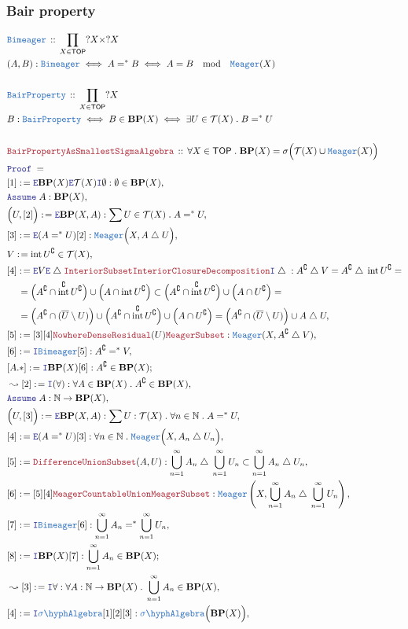 \documentclass[12pt]{scrartcl}
\newcommand{\TYPE}[1]{\textcolor{NavyBlue}{\mathtt{#1}}}
\newcommand{\LOGIC}[1]{\textcolor{Blue}{\mathtt{#1}}}
\newcommand{\THM}[1]{\textcolor{Maroon}{\mathtt{#1}}}
\renewcommand{\.}{\; . \;}
\newcommand{\de}{: \kern 0.1pc =}
\newcommand{\Theorem}[2]{& \THM{#1} \, :: \, #2 \\ & \Proof = \\ }
\newcommand{\DeclareType}[2]{& \TYPE{#1} \, :: \, #2 \\}
\newcommand{\DefineNamedType}[4]{& #1 : \TYPE{#2} \iff #3 \iff #4 \\}
\newcommand{\NewLine}{\\ & \kern 1pc}
\newcommand{\Page}[1]{ \begin{align*} #1 \end{align*}   }
\newcommand{\Intro}{\LOGIC{I}}
\newcommand{\Elim}{\LOGIC{E}}
\newcommand{\Nat}{\mathbb{N} }
\newcommand{\du}{\; \triangle \;}
\renewcommand{\c}{\complement}
\newcommand{\Eqmod}[3]{#1 = #2 \quad \mathrm{mod} \quad #3}
\newcommand{\Say}[3]{& #1 \de #2 : #3, \\}
\newcommand{\SayIn}[3]{& #1 \de #2 \in #3, \\}
\newcommand{\Conclude}[3]{& #1 \de #2 : #3; \\}
\newcommand{\Derive}[3]{& \leadsto #1 \de #2 : #3, \\}
\newcommand{\Assume}[2]{& \LOGIC{Assume} \; #1 : #2, \\}
\newcommand{\Proof}{\LOGIC{Proof} \; }
\newcommand{\SA}{\TYPE{\sigma \hyph Algebra}}
\newcommand{\Meager}{\TYPE{Meager}}
\DeclareMathOperator*{\intx}{int}
\newcommand{\TOP}{\mathsf{TOP}}
\newcommand{\T}{\mathcal{T}}
\newcommand{\BP}{\mathbf{BP}}
\begin{document}
\subsubsection{Bair property}
\Page{
	\DeclareType{Bimeager}{\prod_{X \in \TOP} ?X \times ?X}
	\DefineNamedType{(A,B)}{Bimeager}{A =^* B}{\Eqmod{A}{B}{\Meager(X)}}
	\\
	\DeclareType{BairProperty}{\prod_{X \in \TOP} ?X}
	\DefineNamedType{B}{BairProperty}{B \in \BP(X)}{\exists U \in \T(X) \. B =^* U}
	\\
	\Theorem{BairPropertyAsSmallestSigmaAlgebra}
	{
		\forall X \in \TOP \. 
		\BP(X) = \sigma\Big( \T(X) \cup \TYPE{Meager}(X) \Big)
	}
	\Say{[1]}{\Elim \BP(X) \Elim \T(X) \Intro \emptyset}{\emptyset \in \BP(X)}
	\Assume{A}{\BP(X)}
	\Say{\Big(U,[2]\Big)}{\Elim \BP(X,A)}{\sum U \in \T(X) \. A =^* U}
	\Say{[3]}{\Elim(A =^* U)[2]}{ \Meager\Big(X,A \du U\Big) }
	\SayIn{V}{\intx U^\c}{\T(X)}
	\Say{[4]}
	{
		\Elim V
		\Elim \du
		\THM{InteriorSubset}
		\THM{InteriorClosureDecomposition}
		\Intro \du
	}
	{
		A^\c \du V = 
		A^\c \du \intx{U^\c} = \NewLine =
		\Big(A^\c \cap \intx^\c {U^\c}\Big)
		\cup
		\Big(A \cap \intx{U^\c}  \Big)
		\subset 
		\Big(A^\c \cap \intx^\c{U^\c} \Big)
		\cup
		\Big( A \cap U^\c  \Big)  = \NewLine = 
		\Big( A^\c \cap  (\overline{U}\setminus U) \Big) \cup
		\Big( A^\c \cap \intx^\c {U^\c} \Big) \cup
		\Big( A \cap U^\c \Big) =
		\Big( A^\c \cap (\overline{U}\setminus U) \Big) \cup
		A \du U
	}
	\Say{[5]}{[3][4]\THM{NowhereDenseResidual}(U)\THM{MeagerSubset}}
	{
		\Meager(X, A^\c \du V)
	}
	\Say{[6]}{\Intro \TYPE{Bimeager}[5]}
	{
		A^\c =^* V
	}
	\Conclude{[A.*]}{\Intro \BP(X)[6]}{A^\c \in \BP(X)}
	\Derive{[2]}{\Intro(\forall)}{\forall A \in \BP(X) \. A^\c \in \BP(X)}
	\Assume{A}{\Nat \to \BP(X)}
	\Say{\Big(U,[3]\Big)}{\Elim \BP(X,A)}{\sum U  : \T(X) \. \forall n \in \Nat \. A =^* U}
	\Say{[4]}{\Elim(A =^* U)[3]}{ \forall n \in \Nat \. \Meager\Big(X,A_n \du U_n\Big) }
	\Say{[5]}{\THM{DifferenceUnionSubset}(A,U)}
	{
		\bigcup^\infty_{n=1} A_n \du \bigcup^\infty_{n=1} U_n \subset
		\bigcup^\infty_{n=1} A_n \du U_n
	}
	\Say{[6]}{[5][4]\THM{MeagerCountableUnion}\THM{MeagerSubset}}
	{
		\Meager\left(X, \bigcup^\infty_{n=1} A_n \du \bigcup^\infty_{n=1} U_n \right)
	}
	\Say{[7]}{
		\Intro \TYPE{Bimeager}[6]
	}
	{
			\bigcup^\infty_{n=1} A_n =^* \bigcup^\infty_{n=1} U_n
	}
	\Conclude{[8]}{\Intro \BP(X) [7]}
	{
		\bigcup^\infty_{n=1} A_n \in \BP(X)
	}
	\Derive{[3]}{\Intro \forall}
	{
		\forall A : \Nat \to \BP(X) \.
		\bigcup^\infty_{n=1} A_n \in \BP(X)
	}
	\Say{[4]}{\Intro \SA[1][2][3]}{\SA\Big( \BP(X) \Big)}
}
\end{document}
